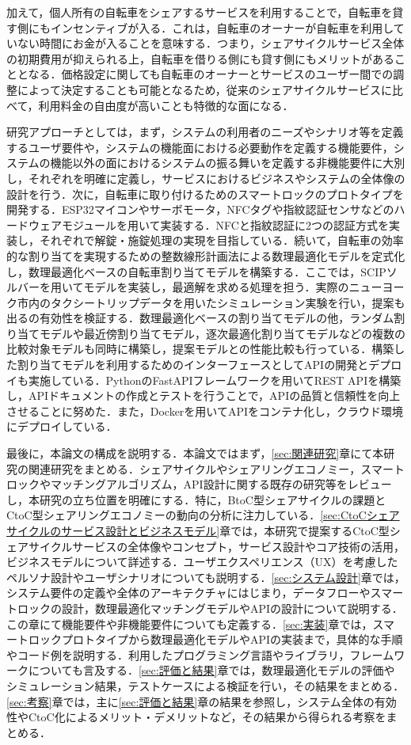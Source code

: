         \par 加えて，個人所有の自転車をシェアするサービスを利用することで，自転車を貸す側にもインセンティブが入る．これは，自転車のオーナーが自転車を利用していない時間にお金が入ることを意味する．つまり，シェアサイクルサービス全体の初期費用が抑えられる上，自転車を借りる側にも貸す側にもメリットがあることとなる．価格設定に関しても自転車のオーナーとサービスのユーザー間での調整によって決定することも可能となるため，従来のシェアサイクルサービスに比べて，利用料金の自由度が高いことも特徴的な面になる．
        \par 研究アプローチとしては，まず，システムの利用者のニーズやシナリオ等を定義するユーザ要件や，システムの機能面における必要動作を定義する機能要件，システムの機能以外の面におけるシステムの振る舞いを定義する非機能要件に大別し，それぞれを明確に定義し，サービスにおけるビジネスやシステムの全体像の設計を行う．次に，自転車に取り付けるためのスマートロックのプロトタイプを開発する．ESP32マイコンやサーボモータ，NFCタグや指紋認証センサなどのハードウェアモジュールを用いて実装する．NFCと指紋認証に2つの認証方式を実装し，それぞれで解錠・施錠処理の実現を目指している．続いて，自転車の効率的な割り当てを実現するための整数線形計画法による数理最適化モデルを定式化し，数理最適化ベースの自転車割り当てモデルを構築する．ここでは，SCIPソルバーを用いてモデルを実装し，最適解を求める処理を担う．実際のニューヨーク市内のタクシートリップデータを用いたシミュレーション実験を行い，提案も出るの有効性を検証する．数理最適化ベースの割り当てモデルの他，ランダム割り当てモデルや最近傍割り当てモデル，逐次最適化割り当てモデルなどの複数の比較対象モデルも同時に構築し，提案モデルとの性能比較も行っている．構築した割り当てモデルを利用するためのインターフェースとしてAPIの開発とデプロイも実施している．PythonのFastAPIフレームワークを用いてREST APIを構築し，APIドキュメントの作成とテストを行うことで，APIの品質と信頼性を向上させることに努めた．また，Dockerを用いてAPIをコンテナ化し，クラウド環境にデプロイしている．
        \par 最後に，本論文の構成を説明する．本論文ではまず，\ref{sec:関連研究}章にて本研究の関連研究をまとめる．シェアサイクルやシェアリングエコノミー，スマートロックやマッチングアルゴリズム，API設計に関する既存の研究等をレビューし，本研究の立ち位置を明確にする．特に，BtoC型シェアサイクルの課題とCtoC型シェアリングエコノミーの動向の分析に注力している．\ref{sec:CtoCシェアサイクルのサービス設計とビジネスモデル}章では，本研究で提案するCtoC型シェアサイクルサービスの全体像やコンセプト，サービス設計やコア技術の活用，ビジネスモデルについて詳述する．ユーザエクスペリエンス（UX）を考慮したペルソナ設計やユーザシナリオについても説明する．\ref{sec:システム設計}章では，システム要件の定義や全体のアーキテクチャにはじまり，データフローやスマートロックの設計，数理最適化マッチングモデルやAPIの設計について説明する．この章にて機能要件や非機能要件についても定義する．\ref{sec:実装}章では，スマートロックプロトタイプから数理最適化モデルやAPIの実装まで，具体的な手順やコード例を説明する．利用したプログラミング言語やライブラリ，フレームワークについても言及する．\ref{sec:評価と結果}章では，数理最適化モデルの評価やシミュレーション結果，テストケースによる検証を行い，その結果をまとめる．\ref{sec:考察}章では，主に\ref{sec:評価と結果}章の結果を参照し，システム全体の有効性やCtoC化によるメリット・デメリットなど，その結果から得られる考察をまとめる．

